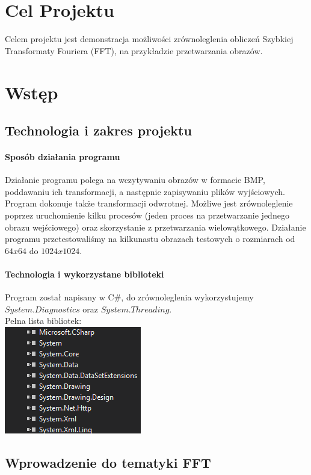 \section{Cel Projektu}
Celem projektu jest demonstracja możliwości zrównoleglenia obliczeń Szybkiej Transformaty Fouriera (FFT), na przykładzie przetwarzania obrazów.
\section{Wstęp}
\subsection{Technologia i zakres projektu}
\paragraph{Sposób działania programu}
Działanie programu polega na wczytywaniu obrazów w formacie BMP, poddawaniu ich
transformacji, a następnie zapisywaniu plików wyjściowych. Program dokonuje także transformacji odwrotnej. Możliwe jest zrównoleglenie poprzez uruchomienie kilku procesów (jeden proces na przetwarzanie jednego obrazu wejściowego) oraz skorzystanie z przetwarzania wielowątkowego. Działanie programu przetestowaliśmy na kilkunastu obrazach testowych o rozmiarach od $ 64x64 $ do $ 1024x1024 $.
\paragraph{Technologia i wykorzystane biblioteki}Program został napisany w C\#, do zrównoleglenia wykorzystujemy $ System.Diagnostics $ oraz $ System.Threading $.\\
 Pełna lista bibliotek:\\
 
\includegraphics[scale=1]{figures/bibl.png}

\subsection{Wprowadzenie do tematyki FFT}

